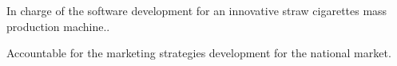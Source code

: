 \documentclass[]{deedy-resume-openfont}
\begin{document}
\begin{minipage}[t]{0.5\textwidth}
\begin{tightemize}
\item In charge of the software development for an innovative straw cigarettes mass production machine..
\item Accountable for the marketing strategies development for the national market.
\end{tightemize}
\sectionsep

\end{minipage} 
\end{document}
